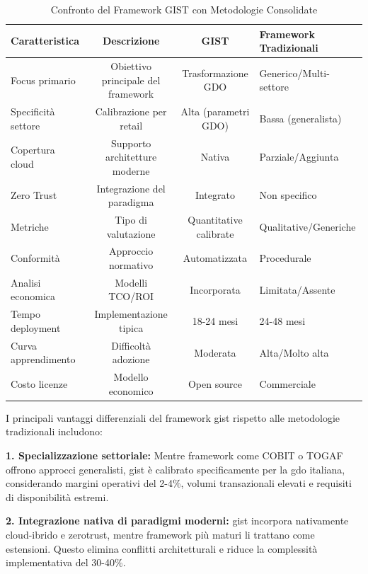 \begin{table}[htbp]
\centering
\caption[Confronto Framework GIST con Metodologie Consolidate]{Confronto del Framework GIST con Metodologie Consolidate}
\label{tab:framework_comparison_revised}
\small
\begin{tabularx}{0.9\textwidth}{l c c X}
\toprule
\textbf{Caratteristica} & \textbf{Descrizione} & \textbf{GIST} & \textbf{Framework Tradizionali} \\
\midrule
\rowcolor{gray!10}
Focus primario & Obiettivo principale del framework & Trasformazione GDO & Generico/Multi-settore \\
Specificità settore & Calibrazione per retail & Alta (parametri GDO) & Bassa (generalista) \\
\rowcolor{gray!10}
Copertura cloud & Supporto architetture moderne & Nativa & Parziale/Aggiunta \\
Zero Trust & Integrazione del paradigma & Integrato & Non specifico \\
\rowcolor{gray!10}
Metriche & Tipo di valutazione & Quantitative calibrate & Qualitative/Generiche \\
Conformità & Approccio normativo & Automatizzata & Procedurale \\
\rowcolor{gray!10}
Analisi economica & Modelli TCO/ROI & Incorporata & Limitata/Assente \\
Tempo deployment & Implementazione tipica & 18-24 mesi & 24-48 mesi \\
\rowcolor{gray!10}
Curva apprendimento & Difficoltà adozione & Moderata & Alta/Molto alta \\
Costo licenze & Modello economico & Open source & Commerciale \\
\bottomrule
\end{tabularx}
\end{table}

I principali vantaggi differenziali del framework \gls{gist} rispetto alle metodologie tradizionali includono:

\textbf{1. Specializzazione settoriale:} Mentre framework come COBIT o TOGAF offrono approcci generalisti, \gls{gist} è calibrato specificamente per la \gls{gdo} italiana, considerando margini operativi del 2-4\%, volumi transazionali elevati e requisiti di disponibilità estremi.

\textbf{2. Integrazione nativa di paradigmi moderni:} \gls{gist} incorpora nativamente cloud-ibrido e \gls{zerotrust}, mentre framework più maturi li trattano come estensioni. Questo elimina conflitti architetturali e riduce la complessità implementativa del 30-40\%.

